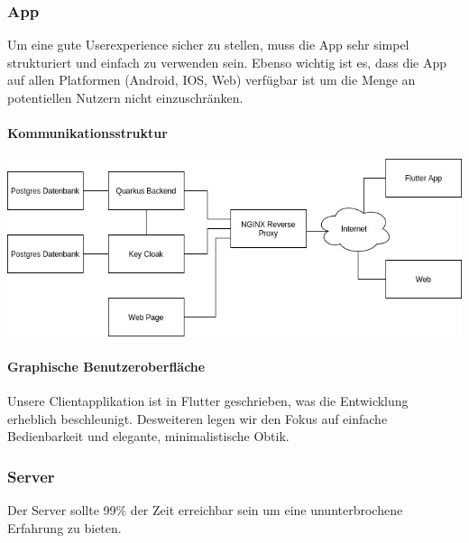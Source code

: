 \documentclass[12pt]{article}
\theoremstyle{definition}
\begin{document}
\subsubsection{App}

Um eine gute Userexperience sicher zu stellen, muss die App sehr simpel strukturiert und einfach zu verwenden sein. Ebenso wichtig ist es, dass die App auf allen Platformen (Android, IOS, Web) verfügbar ist um die Menge an potentiellen Nutzern nicht einzuschränken.

\paragraph{Kommunikationsstruktur}
\begin{center}

\includegraphics[width=15cm]{Kommunikationsdiagramm.jpg}

\end{center}
\pagebreak

\paragraph{Graphische Benutzeroberfläche}
\begin{flushleft}
Unsere Clientapplikation ist in Flutter geschrieben, was die Entwicklung erheblich beschleunigt. Desweiteren legen wir den Fokus auf einfache Bedienbarkeit und elegante, minimalistische Obtik.

\end{flushleft}

\begin{flushleft}

\end{flushleft}

\subsubsection{Server}
Der Server sollte 99\% der Zeit erreichbar sein um eine ununterbrochene Erfahrung zu bieten.\\
\end{document}
